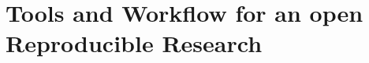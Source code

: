 



\chapter{Tools and Workflow for an open Reproducible Research} %

\label{ch:methodology} %



%
%
%








